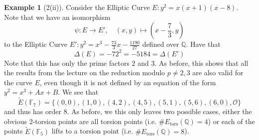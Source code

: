 \documentclass{scrartcl}
\newcommand{\F}{\mathbb{F}}
\newcommand{\Q}{\mathbb{Q}}
\renewcommand{\O}{\mathcal{O}}
\theoremstyle{definition}
\newtheorem{example}[subsection]{Example}
\begin{document}
\begin{example}[2(ii)]
    \label{ex:2ii}
    Consider the Elliptic Curve $E: y^2 = x(x + 1)(x - 8)$.
    Note that we have an isomorphism
    \begin{equation*}
        \psi: E \to E', \quad (x, y) \mapsto \left( x - \frac 7 3, y \right)
    \end{equation*}
    to the Elliptic Curve $E': y^2 = x^3 - \frac {73} 3 x - \frac {1190} {27}$ defined over $\Q$.
    Have that
    \begin{equation*}
        \Delta(E) = -72^2 = -5184 = \Delta(E')
    \end{equation*}
    Note that this has only the prime factors $2$ and $3$.
    As before, this shows that all the results from the lecture on the reduction modulo $p \neq 2, 3$ are also valid for the curve $E$, even though it is not defined by an equation of the form $y^2 = x^3 + Ax + B$.
    We see that
    \begin{equation*}
        \tilde{E}(\F_7) = \{ (0, 0), (1, 0), (4, 2), (4, 5), (5, 1), (5, 6), (6, 0), \O \}
    \end{equation*}
    and thus has order 8.
    As before, we this only leaves two possible cases, either the obvious 2-torsion points are all torsion points (i.e. $\#E_{\mathrm{tors}}(\Q) = 4$) or each of the points $\tilde{E}(\F_5)$ lifts to a torsion point (i.e. $\#E_{\mathrm{tors}}(\Q) = 8$).


\end{example}
\end{document}
